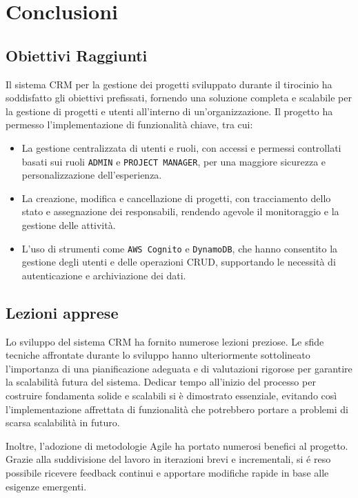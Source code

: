 \documentclass[target=bach,aauheader=,style=]{thud}
\begin{document}
\chapter{Conclusioni}

\section{Obiettivi Raggiunti}
Il sistema CRM per la gestione dei progetti sviluppato durante il tirocinio ha soddisfatto gli obiettivi prefissati, fornendo una soluzione completa e scalabile per la gestione di progetti e utenti all'interno di un'organizzazione. Il progetto ha permesso l'implementazione di funzionalità chiave, tra cui:
\begin{itemize}
    \item La gestione centralizzata di utenti e ruoli, con accessi e permessi controllati basati sui ruoli \texttt{ADMIN} e \texttt{PROJECT MANAGER}, per una maggiore sicurezza e personalizzazione dell'esperienza.
    \item La creazione, modifica e cancellazione di progetti, con tracciamento dello stato e assegnazione dei responsabili, rendendo agevole il monitoraggio e la gestione delle attività.
    \item L'uso di strumenti come \texttt{AWS Cognito} e \texttt{DynamoDB}, che hanno consentito la gestione degli utenti e delle operazioni CRUD, supportando le necessità di autenticazione e archiviazione dei dati.
\end{itemize}

\section{Lezioni apprese}
Lo sviluppo del sistema CRM ha fornito numerose lezioni preziose. Le sfide tecniche affrontate durante lo sviluppo hanno ulteriormente sottolineato l'importanza di una pianificazione adeguata e di valutazioni rigorose per garantire la scalabilità futura del sistema. Dedicar tempo all'inizio del processo per costruire fondamenta solide e scalabili si è dimostrato essenziale, evitando così l'implementazione affrettata di funzionalità che potrebbero portare a problemi di scarsa scalabilità in futuro.

\noindent Inoltre, l'adozione di metodologie Agile ha portato numerosi benefici al progetto. Grazie alla suddivisione del lavoro in iterazioni brevi e incrementali, si é reso possibile ricevere feedback continui e apportare modifiche rapide in base alle esigenze emergenti.
\end{document}
